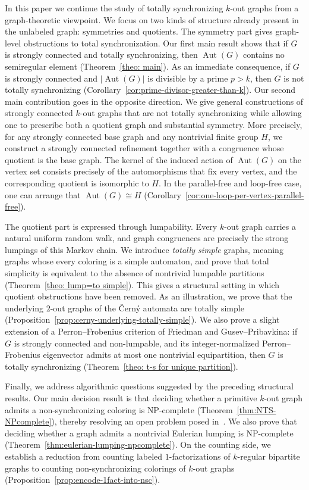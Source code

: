 \documentclass[a4paper,10pt]{amsart}
\theoremstyle{plain}
\theoremstyle{definition}
\DeclareMathOperator{\Aut}{Aut}
\begin{document}
In this paper we continue the study of totally synchronizing $k$-out graphs from a graph-theoretic viewpoint.
We focus on two kinds of structure already present in the unlabeled graph: symmetries and quotients.
The symmetry part gives graph-level obstructions to total synchronization.
Our first main result shows that if $G$ is strongly connected and totally synchronizing, then $\Aut(G)$ contains no semiregular element (Theorem~\ref{theo: main}).
As an immediate consequence, if $G$ is strongly connected and $|\Aut(G)|$ is divisible by a prime $p>k$, then $G$ is not totally synchronizing (Corollary~\ref{cor:prime-divisor-greater-than-k}).
Our second main contribution goes in the opposite direction.
We give general constructions of strongly connected $k$-out graphs that are not totally synchronizing while allowing one to prescribe both a quotient graph and substantial symmetry.
More precisely, for any strongly connected base graph and any nontrivial finite group $H$, we construct a strongly connected refinement together with a congruence whose quotient is the base graph. The kernel of the induced action of $\Aut(G)$ on the vertex set consists precisely of the automorphisms that fix every vertex, and the corresponding quotient is isomorphic to $H$. In the parallel-free and loop-free case, one can arrange that $\Aut(G)\cong H$ (Corollary~\ref{cor:one-loop-per-vertex-parallel-free}).

The quotient part is expressed through lumpability.
Every $k$-out graph carries a natural uniform random walk, and graph congruences are precisely the strong lumpings of this Markov chain.
We introduce \emph{totally simple} graphs, meaning graphs whose every coloring is a simple automaton, and prove that total simplicity is equivalent to the absence of nontrivial lumpable partitions (Theorem~\ref{theo: lump=to simple}).
This gives a structural setting in which quotient obstructions have been removed.
As an illustration, we prove that the underlying $2$-out graphs of the \v{C}ern\'y automata are totally simple (Proposition~\ref{prop:cerny-underlying-totally-simple}).
We also prove a slight extension of a Perron--Frobenius criterion of Friedman and Gusev--Pribavkina: if $G$ is strongly connected and non-lumpable, and its integer-normalized Perron--Frobenius eigenvector admits at most one nontrivial equipartition, then $G$ is totally synchronizing (Theorem~\ref{theo: t-s for unique partition}).

Finally, we address algorithmic questions suggested by the preceding structural results.
Our main decision result is that deciding whether a primitive $k$-out graph admits a non-synchronizing coloring is NP-complete (Theorem~\ref{thm:NTS-NPcomplete}), thereby resolving an open problem posed in~\cite{GusevSzykula15}.
We also prove that deciding whether a graph admits a nontrivial Eulerian lumping is NP-complete (Theorem~\ref{thm:eulerian-lumping-npcomplete}).
On the counting side, we establish a reduction from counting labeled $1$-factorizations of $k$-regular bipartite graphs to counting non-synchronizing colorings of $k$-out graphs (Proposition~\ref{prop:encode-1fact-into-nsc}).
\end{document}
